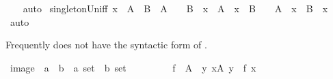 \begin{isabellebody}
%
\isadelimproof
\ \ %
\endisadelimproof
%
\isatagproof
{}\isamarkupfalse%
\ auto%
\endisatagproof
{\isafoldproof}%
%
\isadelimproof
\isanewline
%
\endisadelimproof
\isanewline
{}\isamarkupfalse%
\ singleton{\isacharunderscore}{\kern0pt}Un{\isacharunderscore}{\kern0pt}iff{\isacharcolon}{\kern0pt}\ {\isachardoublequoteopen}{\isacharbraceleft}{\kern0pt}x{\isacharbraceright}{\kern0pt}\ {\isacharequal}{\kern0pt}\ A\ {\isasymunion}\ B\ {\isasymlongleftrightarrow}\ A\ {\isacharequal}{\kern0pt}\ {\isacharbraceleft}{\kern0pt}{\isacharbraceright}{\kern0pt}\ {\isasymand}\ B\ {\isacharequal}{\kern0pt}\ {\isacharbraceleft}{\kern0pt}x{\isacharbraceright}{\kern0pt}\ {\isasymor}\ A\ {\isacharequal}{\kern0pt}\ {\isacharbraceleft}{\kern0pt}x{\isacharbraceright}{\kern0pt}\ {\isasymand}\ B\ {\isacharequal}{\kern0pt}\ {\isacharbraceleft}{\kern0pt}{\isacharbraceright}{\kern0pt}\ {\isasymor}\ A\ {\isacharequal}{\kern0pt}\ {\isacharbraceleft}{\kern0pt}x{\isacharbraceright}{\kern0pt}\ {\isasymand}\ B\ {\isacharequal}{\kern0pt}\ {\isacharbraceleft}{\kern0pt}x{\isacharbraceright}{\kern0pt}{\isachardoublequoteclose}\isanewline
%
\isadelimproof
\ \ %
\endisadelimproof
%
\isatagproof
{}\isamarkupfalse%
\ auto%
\endisatagproof
{\isafoldproof}%
%
\isadelimproof
%
\endisadelimproof
%
\isadelimdocument
%
\endisadelimdocument
%
\isatagdocument
%
\isamarkuptrue%
%
\endisatagdocument
{\isafolddocument}%
%
\isadelimdocument
%
\endisadelimdocument
%
\begin{isamarkuptext}%
Frequently  does not have the syntactic form of .%
\end{isamarkuptext}\isamarkuptrue%
\isamarkupfalse%
\ image\ {\isacharcolon}{\kern0pt}{\isacharcolon}{\kern0pt}\ {\isachardoublequoteopen}{\isacharparenleft}{\kern0pt}{\isacharprime}{\kern0pt}a\ {\isasymRightarrow}\ {\isacharprime}{\kern0pt}b{\isacharparenright}{\kern0pt}\ {\isasymRightarrow}\ {\isacharprime}{\kern0pt}a\ set\ {\isasymRightarrow}\ {\isacharprime}{\kern0pt}b\ set{\isachardoublequoteclose}\ \ \ \ {\isacharparenleft}{\kern0pt}\ {\isachardoublequoteopen}{\isacharbackquote}{\kern0pt}{\isachardoublequoteclose}\ {}{}{\isacharparenright}{\kern0pt}\isanewline
\ \ \ {\isachardoublequoteopen}f\ {\isacharbackquote}{\kern0pt}\ A\ {\isacharequal}{\kern0pt}\ {\isacharbraceleft}{\kern0pt}y{\isachardot}{\kern0pt}\ {\isasymexists}x{\isasymin}A{\isachardot}{\kern0pt}\ y\ {\isacharequal}{\kern0pt}\ f\ x{\isacharbraceright}{\kern0pt}{\isachardoublequoteclose}\isanewline

\end{isabellebody}
